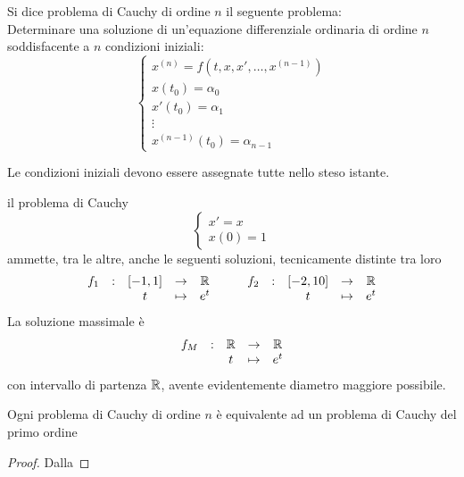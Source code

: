 \begin{definition}
	Si dice problema di Cauchy di ordine $n$ il seguente problema:\\
	Determinare una soluzione di un'equazione differenziale ordinaria di ordine $n$ soddisfacente a $n$ condizioni iniziali:
	$$\begin{cases}
		x^{(n)}=f(t,x,x',\dotsc,x^{(n-1)})\\
		x(t_0)=\alpha_0\\
		x'(t_0)=\alpha_1\\
		\vdots\\
		x^{(n-1)}(t_0)=\alpha_{n-1}
	\end{cases}$$
\end{definition}
\begin{note}
	Le condizioni iniziali devono essere assegnate tutte nello steso istante.
\end{note}
\begin{example}
	il problema di Cauchy $$\begin{cases}x'=x\\x(0)=1\end{cases}$$
	ammette, tra le altre, anche le seguenti soluzioni, tecnicamente distinte tra loro
	$$\begin{array}{ccccc} {f_1} & : & { \left[-1,1\right] } & \to & {\mathbb{R}} \\ & & {t} & \mapsto & {e^t} \\ \end{array} \qquad \begin{array}{ccccc} {f_2} & : & { \left[-2,10\right] } & \to & {\mathbb{R}} \\ & & {t} & \mapsto & {e^t} \\ \end{array}$$
	La soluzione massimale è
	$$\begin{array}{ccccc} {f_M} & : & {\mathbb{R}} & \to & {\mathbb{R}} \\ & & {t} & \mapsto & {e^t} \\ \end{array}$$
	con intervallo di partenza $\mathbb{R}$, avente evidentemente diametro maggiore possibile.
\end{example}
\begin{proposition}
	Ogni problema di Cauchy di ordine $n$ è equivalente ad un problema di Cauchy del primo ordine
	\begin{proof}
		Dalla 
	\end{proof}
\end{proposition}

